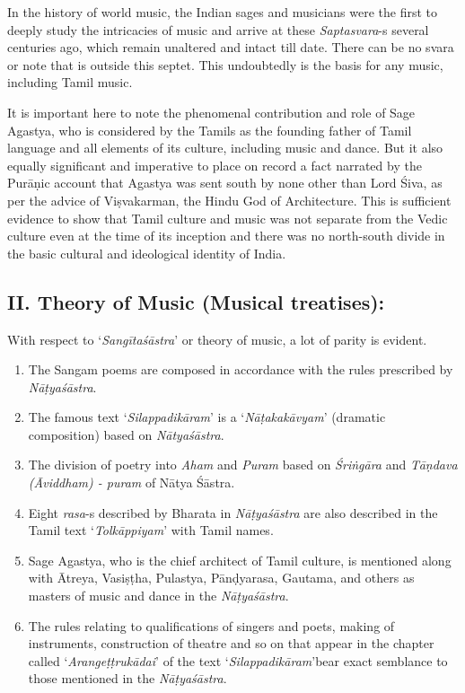 In the history of world music, the Indian sages and musicians were the first to deeply study the intricacies of music and arrive at these \textit{Saptasvara}-s several centuries ago, which remain unaltered and intact till date. There can be no svara or note that is outside this septet. This undoubtedly is the basis for any music, including Tamil music.

It is important here to note the phenomenal contribution and role of Sage Agastya, who is considered by the Tamils as the founding father of Tamil language and all elements of its culture, including music and dance. But it also equally significant and imperative to place on record a fact narrated by the Purāṇic account that Agastya was sent south by none other than Lord Śiva, as per the advice of Viṣvakarman, the Hindu God of Architecture. This is sufficient evidence to show that Tamil culture and music was not separate from the Vedic culture even at the time of its inception and there was no north-south divide in the basic cultural and ideological identity of India.


\subsection*{II. Theory of Music (Musical treatises):}

With respect to ‘\textit{Sangītaśāstra}’ or theory of music, a lot of parity is evident.

\begin{enumerate}[{\rm 1.}]
\itemsep=0pt
\item The Sangam poems are composed in accordance with the rules prescribed by \textit{Nāṭyaśāstra}.

 \item The famous text ‘\textit{Silappadikāram}’ is a ‘\textit{Nāṭakakāvyam}’ (dramatic composition) based on \textit{Nātyaśāstra}.

 \item The division of poetry into \textit{Aham} and \textit{Puram} based on \textit{Śriṅgāra} and \textit{Tāṇdava (Āviddham) - puram} of Nātya Śāstra.

 \item Eight \textit{rasa}-s described by Bharata in \textit{Nāṭyaśāstra }are also described in the Tamil text ‘\textit{Tolkāppiyam}’ with Tamil names.

 \item Sage Agastya, who is the chief architect of Tamil culture, is mentioned along with Ātreya, Vasiṣṭha, Pulastya, Pānḍyarasa, Gautama, and others as masters of music and dance in the \textit{Nāṭyaśāstra}.

 \item The rules relating to qualifications of singers and poets, making of instruments, construction of theatre and so on that appear in the chapter called ‘\textit{Arangeṭṭrukādai}’ of the text ‘\textit{Silappadikāram}’bear exact semblance to those mentioned in the \textit{Nāṭyaśāstra}.

\end{enumerate}

